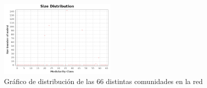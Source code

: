 \documentclass[10pt,a4paper,spanish]{article}
\numberwithin{equation}{section} %
\numberwithin{figure}{section} %
\numberwithin{table}{section} %
\begin{document}
\begin{figure}[!h]
    \centering
    \includegraphics[width=0.5\textwidth]{modularity-report/communities-size-distribution}
    \caption{Gráfico de distribución de las 66 distintas comunidades en la red}
    \label{com}
\end{figure}
\end{document}
